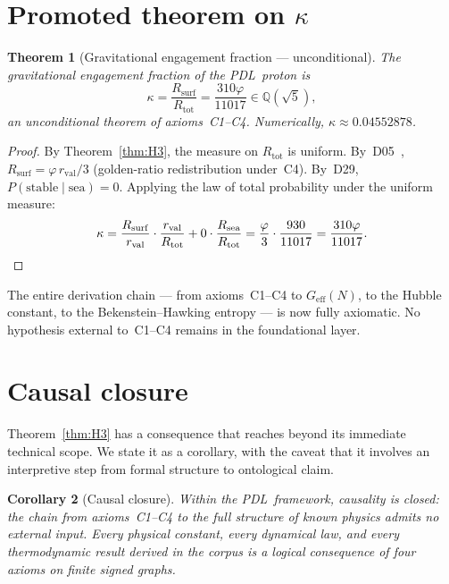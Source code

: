 \documentclass[11pt,a4paper]{article}
\theoremstyle{plain}
\newtheorem{theorem}{Theorem}[section]
\newtheorem{corollary}[theorem]{Corollary}
\theoremstyle{definition}
\theoremstyle{remark}
\newcommand{\PDL}{\textnormal{PDL}}
\newcommand{\Rtot}{R_{\mathrm{tot}}}
\newcommand{\Rsurf}{R_{\mathrm{surf}}}
\newcommand{\Rsea}{R_{\mathrm{sea}}}
\newcommand{\rval}{r_{\mathrm{val}}}
\newcommand{\vp}{\varphi}
\newcommand{\kap}{\kappa}
\begin{document}
\section{Promoted theorem on \texorpdfstring{$\kap$}{kappa}}
\label{sec:kappa}

\begin{theorem}[Gravitational engagement fraction --- unconditional]
\label{thm:kappa}
The gravitational engagement fraction of the \PDL\ proton is
\[
\kap = \frac{\Rsurf}{\Rtot} = \frac{310\vp}{11017} \in \mathbb{Q}(\sqrt{5}),
\]
an unconditional theorem of axioms~C1--C4. Numerically, $\kap \approx 0.04552878$.
\end{theorem}

\begin{proof}
By Theorem~\ref{thm:H3}, the measure on $\Rtot$ is uniform. By~D05~\cite{PDL_D05_2026}, $\Rsurf = \vp\,\rval/3$ (golden-ratio redistribution under~C4). By~D29, $P(\mathrm{stable}\mid\mathrm{sea}) = 0$. Applying the law of total probability under the uniform measure:
\[
\kap = \frac{\Rsurf}{\rval} \cdot \frac{\rval}{\Rtot} + 0 \cdot \frac{\Rsea}{\Rtot} = \frac{\vp}{3} \cdot \frac{930}{11017} = \frac{310\vp}{11017}. \qedhere
\]
\end{proof}

\noindent The entire derivation chain --- from axioms~C1--C4 to $G_{\mathrm{eff}}(N)$, to the Hubble constant, to the Bekenstein--Hawking entropy --- is now fully axiomatic. No hypothesis external to~C1--C4 remains in the foundational layer.

\section{Causal closure}
\label{sec:causality}

Theorem~\ref{thm:H3} has a consequence that reaches beyond its immediate technical scope. We state it as a corollary, with the caveat that it involves an interpretive step from formal structure to ontological claim.

\begin{corollary}[Causal closure]
\label{cor:causal}
Within the \PDL\ framework, causality is closed: the chain from axioms~C1--C4 to the full structure of known physics admits no external input. Every physical constant, every dynamical law, and every thermodynamic result derived in the corpus is a logical consequence of four axioms on finite signed graphs.
\end{corollary}
\end{document}

